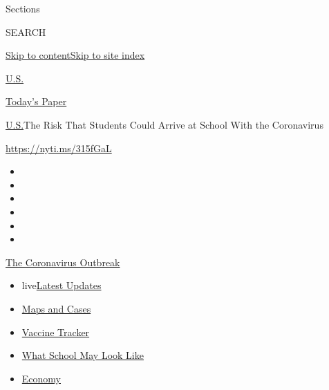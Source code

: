 Sections

SEARCH

\protect\hyperlink{site-content}{Skip to
content}\protect\hyperlink{site-index}{Skip to site index}

\href{https://www.nytimes.com/section/us}{U.S.}

\href{https://myaccount.nytimes.com/auth/login?response_type=cookie\&client_id=vi}{}

\href{https://www.nytimes.com/section/todayspaper}{Today's Paper}

\href{/section/us}{U.S.}\textbar{}The Risk That Students Could Arrive at
School With the Coronavirus

\url{https://nyti.ms/315fGaL}

\begin{itemize}
\item
\item
\item
\item
\item
\item
\end{itemize}

\href{https://www.nytimes.com/news-event/coronavirus?action=click\&pgtype=Article\&state=default\&region=TOP_BANNER\&context=storylines_menu}{The
Coronavirus Outbreak}

\begin{itemize}
\tightlist
\item
  live\href{https://www.nytimes.com/2020/08/01/world/coronavirus-covid-19.html?action=click\&pgtype=Article\&state=default\&region=TOP_BANNER\&context=storylines_menu}{Latest
  Updates}
\item
  \href{https://www.nytimes.com/interactive/2020/us/coronavirus-us-cases.html?action=click\&pgtype=Article\&state=default\&region=TOP_BANNER\&context=storylines_menu}{Maps
  and Cases}
\item
  \href{https://www.nytimes.com/interactive/2020/science/coronavirus-vaccine-tracker.html?action=click\&pgtype=Article\&state=default\&region=TOP_BANNER\&context=storylines_menu}{Vaccine
  Tracker}
\item
  \href{https://www.nytimes.com/interactive/2020/07/29/us/schools-reopening-coronavirus.html?action=click\&pgtype=Article\&state=default\&region=TOP_BANNER\&context=storylines_menu}{What
  School May Look Like}
\item
  \href{https://www.nytimes.com/live/2020/07/31/business/stock-market-today-coronavirus?action=click\&pgtype=Article\&state=default\&region=TOP_BANNER\&context=storylines_menu}{Economy}
\end{itemize}

